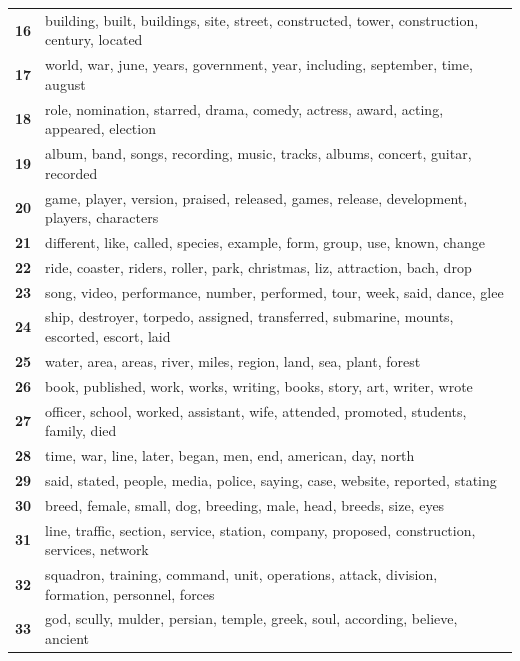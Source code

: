\begin{table}[htpb]
\begin{tabularx}{\textwidth}{@{}l X@{}}
        \textbf{16} & building, built, buildings, site, street, constructed, tower, construction, century, located \\
        \textbf{17} & world, war, june, years, government, year, including, september, time, august \\
        \textbf{18} & role, nomination, starred, drama, comedy, actress, award, acting, appeared, election \\
        \textbf{19} & album, band, songs, recording, music, tracks, albums, concert, guitar, recorded \\
        \textbf{20} & game, player, version, praised, released, games, release, development, players, characters \\
        \textbf{21} & different, like, called, species, example, form, group, use, known, change \\
        \textbf{22} & ride, coaster, riders, roller, park, christmas, liz, attraction, bach, drop \\
        \textbf{23} & song, video, performance, number, performed, tour, week, said, dance, glee \\
        \textbf{24} & ship, destroyer, torpedo, assigned, transferred, submarine, mounts, escorted, escort, laid \\
        \textbf{25} & water, area, areas, river, miles, region, land, sea, plant, forest \\
        \textbf{26} & book, published, work, works, writing, books, story, art, writer, wrote \\
        \textbf{27} & officer, school, worked, assistant, wife, attended, promoted, students, family, died \\
        \textbf{28} & time, war, line, later, began, men, end, american, day, north \\
        \textbf{29} & said, stated, people, media, police, saying, case, website, reported, stating \\
        \textbf{30} & breed, female, small, dog, breeding, male, head, breeds, size, eyes \\
        \textbf{31} & line, traffic, section, service, station, company, proposed, construction, services, network \\
        \textbf{32} & squadron, training, command, unit, operations, attack, division, formation, personnel, forces \\
        \textbf{33} & god, scully, mulder, persian, temple, greek, soul, according, believe, ancient \\

\end{tabularx}
\end{table}
